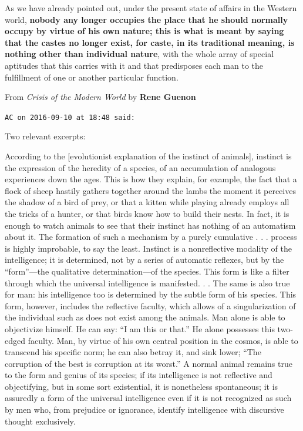 \begin{footnotesize}
\begin{sffamily}
\begin{quotex}
As we have already pointed out, under the present state of affairs in the Western world, \textbf{nobody any longer occupies the place that he should normally occupy by virtue of his own nature; this is what is meant by saying that the castes no longer exist, for caste, in its traditional meaning, is nothing other than individual nature}, with the whole array of special aptitudes that this carries with it and that predisposes each man to the fulfillment of one or another particular function. 

\end{quotex}
From \emph{Crisis of the Modern World} by \textbf{Rene Guenon}


\hfill

\texttt{AC on 2016-09-10 at 18:48 said: }

Two relevant excerpts:

According to the [evolutionist explanation of the instinct of animals], instinct is the expression of the heredity of a species, of an accumulation of analogous experiences down the ages. This is how they explain, for example, the fact that a flock of sheep hastily gathers together around the lambs the moment it perceives the shadow of a bird of prey, or that a kitten while playing already employs all the tricks of a hunter, or that birds know how to build their nests. In fact, it is enough to watch animals to see that their instinct has nothing of an automatism about it. The formation of such a mechanism by a purely cumulative . . . process is highly improbable, to say the least. Instinct is a nonreflective modality of the intelligence; it is determined, not by a series of automatic reflexes, but by the “form”—the qualitative determination—of the species. This form is like a filter through which the universal intelligence is manifested. . . The same is also true for man: his intelligence too is determined by the subtle form of his species. This form, however, includes the reflective faculty, which allows of a singularization of the individual such as does not exist among the animals. Man alone is able to objectivize himself. He can say: “I am this or that.” He alone possesses this two-edged faculty. Man, by virtue of his own central position in the cosmos, is able to transcend his specific norm; he can also betray it, and sink lower; “The corruption of the best is corruption at its worst.” A normal animal remains true to the form and genius of its species; if its intelligence is not reflective and objectifying, but in some sort existential, it is nonetheless spontaneous; it is assuredly a form of the universal intelligence even if it is not recognized as such by men who, from prejudice or ignorance, identify intelligence with discursive thought exclusively. 


\end{sffamily}
\end{footnotesize}
